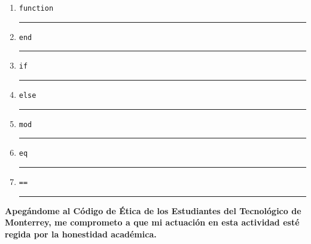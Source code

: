 \documentclass[spanish, 10pt]{article}
\newcommand{\responserule}{{\large\rule{14 cm}{0.3mm}}}
\newcommand{\matlab}[1]{\lstinline[style=Matlab-pyglike]!#1!}
\begin{document}
\begin{enumerate}[label=\alph*)]
	\large
	\item \matlab{function} \\[3ex] \responserule
	\item \matlab{end} \\[3ex] \responserule
	\item \matlab{if} \\[3ex] \responserule
	\item \matlab{else} \\[3ex] \responserule
	\item \matlab{mod} \\[3ex] \responserule
	\item \matlab{eq} \\[3ex] \responserule
	\item \matlab{==} \\[3ex] \responserule
\end{enumerate}

\vfill

\textbf{Apegándome al Código de Ética de los Estudiantes del Tecnológico de Monterrey, me comprometo a que mi actuación en esta actividad esté regida por la honestidad académica.}
\end{document}
